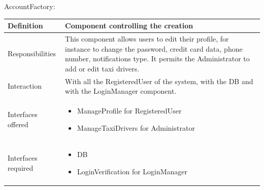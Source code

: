 \documentclass[a4paper,11pt]{report} %
\begin{document}
	AccountFactory:
	\begin{center}
		\begin{tabular}{| l | p{9cm} |}\hline
			Definition & Component controlling the creation \\\hline
			Responsibilities & This component allows users to edit their profile, for instance to change the password, credit card data, phone number, notifications type. It permits the Administrator to add or edit taxi drivers.\\\hline
			Interaction & With all the RegisteredUser of the system, with the DB and with the LoginManager component.\\\hline
			Interfaces offered & \begin{itemize}
				\item ManageProfile for RegisteredUser
				\item ManageTaxiDrivers for Administrator
			\end{itemize}\\\hline
			Interfaces required & \begin{itemize}
				\item DB
				\item LoginVerification for LoginManager
			\end{itemize}\\\hline
		\end{tabular}
	\end{center}
			
\end{document}
